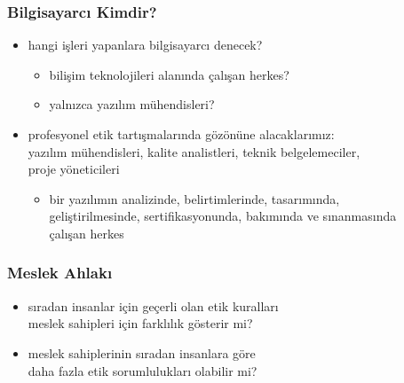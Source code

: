 \documentclass[dvipsnames]{beamer}
\theoremstyle{definition}
\theoremstyle{example}
\theoremstyle{plain}
\begin{document}
\begin{frame}
  \frametitle{Bilgisayarcı Kimdir?}

  \begin{itemize}
    \item hangi işleri yapanlara bilgisayarcı denecek?
    \begin{itemize}
      \item bilişim teknolojileri alanında çalışan herkes?
      \item yalnızca yazılım mühendisleri?
    \end{itemize}

    \pause
    \medskip
    \item profesyonel etik tartışmalarında gözönüne alacaklarımız:\\
      yazılım mühendisleri, kalite analistleri, teknik belgelemeciler,\\
      proje yöneticileri
    \begin{itemize}
      \item bir yazılımın analizinde, belirtimlerinde, tasarımında,\\
        geliştirilmesinde, sertifikasyonunda, bakımında ve sınanmasında\\
        çalışan herkes
    \end{itemize}
  \end{itemize}
\end{frame}

\begin{frame}
  \frametitle{Meslek Ahlakı}

  \begin{itemize}
    \item sıradan insanlar için geçerli olan etik kuralları\\
      meslek sahipleri için farklılık gösterir mi?

    \item meslek sahiplerinin sıradan insanlara göre\\
      daha fazla etik sorumlulukları olabilir mi?
  \end{itemize}
\end{frame}
\end{document}
